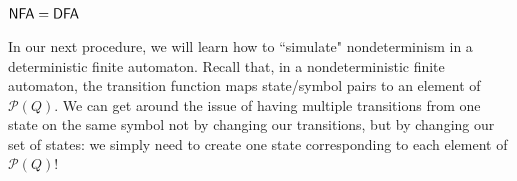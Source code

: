 \begin{example}
\begin{enumerate}
\begin{center}
\end{center}
\end{enumerate}
\end{example}

\subsection{$\textsf{NFA} = \textsf{DFA}$}

In our next procedure, we will learn how to ``simulate" nondeterminism in a deterministic finite automaton. Recall that, in a nondeterministic finite automaton, the transition function maps state/symbol pairs to an element of $\mathcal{P}(Q)$. We can get around the issue of having multiple transitions from one state on the same symbol not by changing our transitions, but by changing our set of states: we simply need to create one state corresponding to each element of $\mathcal{P}(Q)$!

